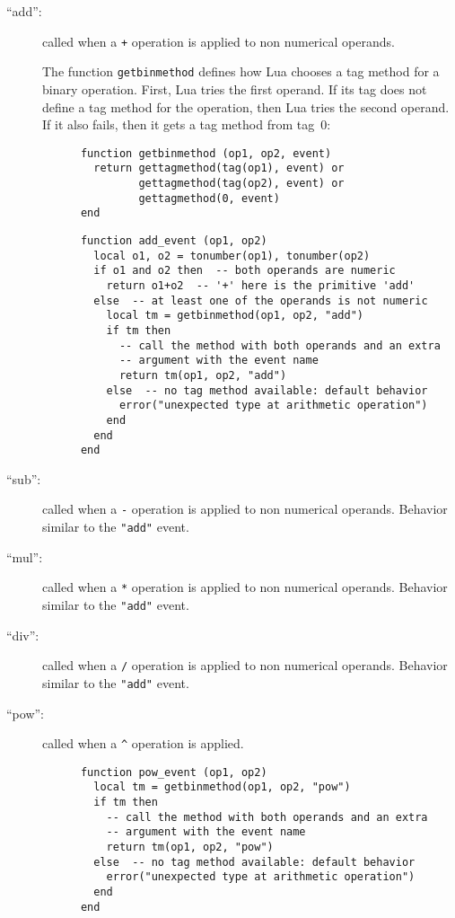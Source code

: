 \documentclass[11pt]{article}
\begin{document}
\begin{description}

\item[``add'':]
called when a \verb|+| operation is applied to non numerical operands.

The function \verb|getbinmethod| defines how Lua chooses a tag method
for a binary operation.
First, Lua tries the first operand.
If its tag does not define a tag method for the operation,
then Lua tries the second operand.
If it also fails, then it gets a tag method from tag~0:
\begin{verbatim}
      function getbinmethod (op1, op2, event)
        return gettagmethod(tag(op1), event) or
               gettagmethod(tag(op2), event) or
               gettagmethod(0, event)
      end
\end{verbatim}
\begin{verbatim}
      function add_event (op1, op2)
        local o1, o2 = tonumber(op1), tonumber(op2)
        if o1 and o2 then  -- both operands are numeric
          return o1+o2  -- '+' here is the primitive 'add'
        else  -- at least one of the operands is not numeric
          local tm = getbinmethod(op1, op2, "add")
          if tm then
            -- call the method with both operands and an extra
            -- argument with the event name
            return tm(op1, op2, "add")
          else  -- no tag method available: default behavior
            error("unexpected type at arithmetic operation")
          end
        end
      end
\end{verbatim}

\item[``sub'':]
called when a \verb|-| operation is applied to non numerical operands.
Behavior similar to the \verb|"add"| event.

\item[``mul'':]
called when a \verb|*| operation is applied to non numerical operands.
Behavior similar to the \verb|"add"| event.

\item[``div'':]
called when a \verb|/| operation is applied to non numerical operands.
Behavior similar to the \verb|"add"| event.

\item[``pow'':]
called when a \verb|^| operation is applied.
\begin{verbatim}
      function pow_event (op1, op2)
        local tm = getbinmethod(op1, op2, "pow")
        if tm then
          -- call the method with both operands and an extra
          -- argument with the event name
          return tm(op1, op2, "pow")
        else  -- no tag method available: default behavior
          error("unexpected type at arithmetic operation")
        end
      end
\end{verbatim}


\end{description}
\end{document}
